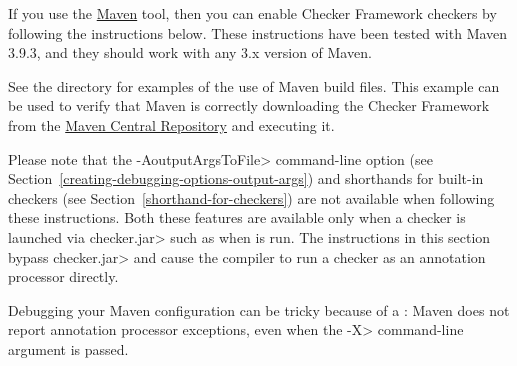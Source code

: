 
If you use the \href{https://maven.apache.org/}{Maven} tool,
then you can enable Checker Framework checkers by following the
instructions below.  These instructions have been tested with
Maven 3.9.3, and they should work with any 3.x version of Maven.

See the directory  for examples of the use of
Maven build files.
This example can be used to verify that
Maven is correctly downloading the Checker Framework from the
\href{https://search.maven.org/search?q=org.checkerframework}{Maven
  Central Repository} and executing it.

Please note that the \<-AoutputArgsToFile> command-line option
(see Section~\ref{creating-debugging-options-output-args}) and shorthands for built-in checkers
(see Section~\ref{shorthand-for-checkers}) are not available when
following these instructions.  Both these features are available only when a checker is
launched via \<checker.jar> such as when 
is run.  The instructions in this section
bypass \<checker.jar> and cause the compiler to run a
checker as an annotation processor directly.

Debugging your Maven configuration can be tricky because of a
: Maven does not report
annotation processor exceptions, even when
the \<-X> command-line argument is passed.


